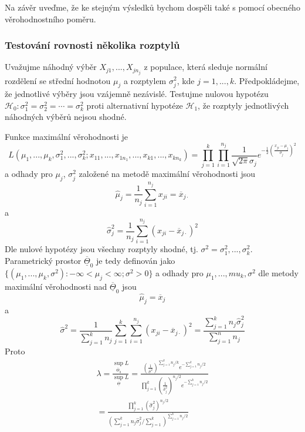 Na závěr uveďme, že ke stejným výsledků bychom dospěli také s pomocí obecného věrohodnostního poměru.

\subsubsection{Testování rovnosti několika rozptylů}

Uvažujme náhodný výběr $X_{j1}, ..., X_{jn_j}$ z populace, která sleduje normální rozdělení se střední hodnotou $\mu_j$ a rozptylem $\sigma_j^2$, kde $j = 1, ..., k$. Předpokládejme, že jednotlivé výběry jsou vzájemně nezávislé. Testujme nulovou hypotézu $\mathscr{H}_0: \sigma_1^2 = \sigma_2^2 = \cdots = \sigma_k^2$ proti alternativní hypotéze $\mathscr{H}_1$, že rozptyly jednotlivých náhodných výběrů nejsou shodné.

Funkce maximální věrohodnosti je
\begin{equation*}
L(\mu_1, ..., \mu_k, \sigma_1^2, ..., \sigma_k^2; x_{11}, ..., x_{1n_1}, ..., x_{k1}, ..., x_{k n_k}) = \prod_{j = 1}^k \prod_{i = 1}^{n_j}\frac{1}{\sqrt{2 \pi}\sigma_j}e^{-\frac{1}{2}\left(\frac{x_{ji} - \mu_j}{\sigma_j}\right)^2}
\end{equation*}
a odhady pro $\mu_j$, $\sigma_j^2$ založené na metodě maximální věrohodnosti jsou
\begin{equation*}
\hat{\mu}_j = \frac{1}{n_j}\sum_{i = 1}^{n_j} x_{ji} = \overline{x}_{j \cdot}
\end{equation*}
a
\begin{equation*}
\hat{\sigma}_j^2 = \frac{1}{n_j}\sum_{i = 1}^{n_j}(x_{ji} - \overline{x}_{j \cdot})^2
\end{equation*}
Dle nulové hypotézy jsou všechny rozptyly shodné, tj. $\sigma^2 = \sigma_1^2, ..., \sigma_k^2$. Parametrický prostor $\overline{\underline{\Theta}}_0$ je tedy definován jako $\{(\mu_1, ..., \mu_k, \sigma^2): -\infty < \mu_j < \infty; \sigma^2 > 0\}$ a odhady pro $\mu_1, ..., mu_k, \sigma^2$ dle metody maximální věrohodnosti nad $\overline{\underline{\Theta}}_0$ jsou
\begin{equation*}
\hat{\mu}_j = \overline{x}_j
\end{equation*}
a
\begin{equation*}
\hat{\sigma}^2 = \frac{1}{\sum_{j = 1}^k n_j} \sum_{j = 1}^k \sum_{i = 1}^{n_j} (x_{ji} - \overline{x}_{j \cdot})^2 = \frac{\sum_{j = 1}^k n_j \hat{\sigma}_j^2}{\sum_{j = 1}^n n_j}
\end{equation*}
Proto
\begin{multline*}
\lambda = \frac{\sup_{\overline{\underline{\Theta}}_0}L}{\sup_{\overline{\underline{\Theta}}}L} = \frac{\left(\frac{1}{\hat{\sigma}^2}\right)^{\sum_{j = 1}^k n_j/k}e^{-\sum_{j = 1}^k n_j/2}}{\prod_{j = 1}^k \left(\frac{1}{\hat{\sigma}_j^2}\right)^{n_j/2} e^{-\sum_{j = 1}^k n_j/2}}\\
= \frac{\prod_{j = 1}^k(\hat{\sigma}_j^2)^{n_j/2}}{\left(\sum_{j = 1}^k n_j \hat{\sigma}_j^2 / \sum_{j = 1}^k\right)^{\sum_{j = 1}^k n_j/2}}
\end{multline*}
